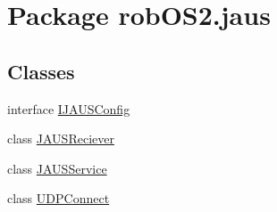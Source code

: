 \hypertarget{namespacerob_o_s2_1_1jaus}{
\section{Package robOS2.jaus}
\label{namespacerob_o_s2_1_1jaus}
}
\subsection*{Classes}
\begin{DoxyCompactItemize}
\item 
interface \hyperlink{interfacerob_o_s2_1_1jaus_1_1_i_j_a_u_s_config}{IJAUSConfig}
\item 
class \hyperlink{classrob_o_s2_1_1jaus_1_1_j_a_u_s_reciever}{JAUSReciever}
\item 
class \hyperlink{classrob_o_s2_1_1jaus_1_1_j_a_u_s_service}{JAUSService}
\item 
class \hyperlink{classrob_o_s2_1_1jaus_1_1_u_d_p_connect}{UDPConnect}
\end{DoxyCompactItemize}
